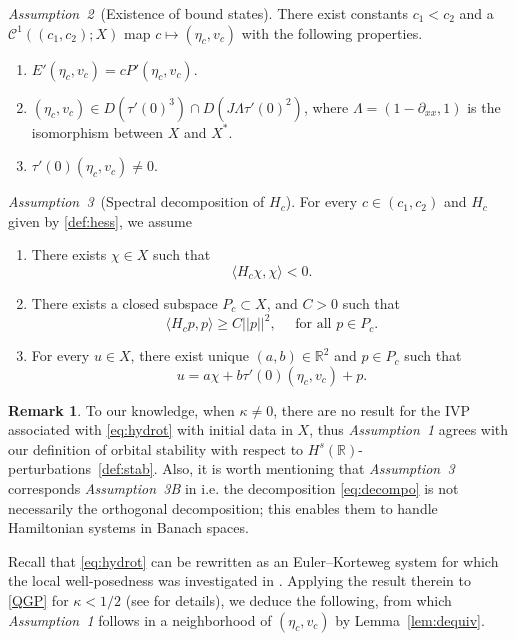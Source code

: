 \documentclass[11pt]{article}
\newcommand{\R}{\mathbb{R}}
\newcommand{\boC}{\mathcal{C}}
\theoremstyle{plain}
\theoremstyle{definition}
\newtheorem{remark}[theorem]{Remark}
\theoremstyle{remark}
\numberwithin{equation}{section}
\begin{document}
{	\textit{Assumption~2}{~(Existence of bound states).} There exist constants $c_1<c_2$ and a $\boC^1((c_1,c_2);X)$ map $c\mapsto(\eta_c,v_c)$ with the following properties. 
	\begin{enumerate}
		\item $E'(\eta_c,v_c)=cP'(\eta_c,v_c)$.
		\item $(\eta_c,v_c)\in D(\tau'(0)^3)\cap D(J\Lambda \tau'(0)^2)$, where $\Lambda=(1-\partial_{xx},1)$ is the isomorphism between $X$ and $X^*$.
		\item $\tau'(0)(\eta_c,v_c)\ne0$.
	\end{enumerate}
	
	
	\textit{Assumption~3}{~(Spectral decomposition of $H_c$).} For every $c\in(c_1,c_2)$ and $H_c$ given by \eqref{def:hess}, we assume
	\begin{enumerate}
		\item There exists $\chi\in X$ such that 
		\begin{equation}
			\langle H_c\chi,\chi\rangle<0.
		\end{equation}
		\item There exists a closed subspace $P_c\subset X$, and $C>0$ such that
		\begin{equation}
			\langle H_cp,p\rangle\geq C||p||^2,\quad\text{ for all }p\in P_c.
		\end{equation}
		\item For every $u\in X$, there exist unique $(a,b)\in\R^2$ and $p\in P_c$ such that
		\begin{equation}\label{eq:decompo}
			u=a\chi+b\tau'(0)(\eta_c,v_c)+p.
		\end{equation}
	\end{enumerate}
	\begin{remark}
		To our knowledge, when $\kappa\ne0$, there are no result for the IVP associated with \eqref{eq:hydrot} with initial data in $X$, thus
		\textit{Assumption~1} agrees with our definition of orbital stability with respect to $ H^{s}(\R)$-perturbations~\eqref{def:stab}.
		Also, it is worth mentioning that \textit{Assumption~3} corresponds \textit{Assumption~3B} in \cite{grillakisshatah} i.e. the decomposition \eqref{eq:decompo} is not necessarily the orthogonal decomposition; this enables them to handle Hamiltonian systems in Banach spaces.
	\end{remark}
	Recall that \eqref{eq:hydrot} can be rewritten as an Euler--Korteweg system for which the local well-posedness was investigated in \cite{benzoniLWP}. Applying the result therein to \eqref{QGP} for $\kappa<1/2$ (see \cite{delaire2023exotic} for details), we deduce the following, from which \textit{Assumption~1} follows in a neighborhood of $(\eta_c,v_c)$ by Lemma~\ref{lem:dequiv}.
}
\end{document}
